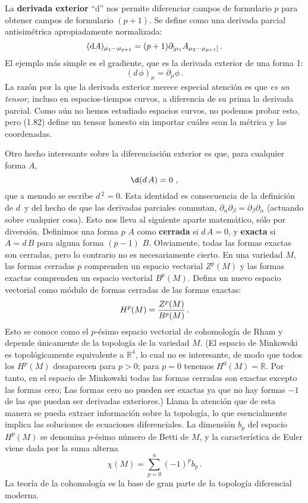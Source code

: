\documentclass[11pt,b5paper,openany,twoside]{book}
\newcommand{\p}[1]{{\partial_{#1}}}
\begin{document}
La {\bf derivada exterior} ``d'' nos permite diferenciar campos de formulario $p$ para obtener campos de formulario $(p+1)$.
Se define como una derivada parcial antisimétrica apropiadamente normalizada:
\begin{equation}
({\rm d}A)_{\mu_1\cdots\mu_{p+1}} = (p+1)\p{[\mu_1}
A_{\mu_2\cdots \mu_{p+1}]}\,.\label{1.82}
\end{equation}
El ejemplo más simple es el gradiente, que es la derivada exterior de una forma 1:
\begin{equation}
( d\, \phi)_\mu = \p{\mu} \phi\,.\label{1.83}
\end{equation}
La razón por la que la derivada exterior merece especial atención es que \textit{es un tensor}, incluso en espacios-tiempos curvos, a diferencia de su prima la derivada parcial.
Como aún no hemos estudiado espacios curvos, no podemos probar esto, pero (1.82) define un tensor honesto sin importar cuáles sean la métrica y las coordenadas.

Otro hecho interesante sobre la diferenciación exterior es que, para cualquier forma $A$,
\begin{equation}
\d( d\,A) =0\ ,\label{1.84}
\end{equation}
que a menudo se escribe $ d\,^2 =0$.
Esta identidad es consecuencia de la definición de $ d\,$ y del hecho de que las derivadas parciales conmutan, $\p\alpha\p\beta = \p\beta\p\alpha$ (actuando sobre cualquier cosa).
Esto nos lleva al siguiente aparte matemático, sólo por diversión.
Definimos una forma $p$ $A$ como {\bf cerrada} si $ d\,A=0$, y {\bf exacta} si $A =  d\,B$ para alguna forma $(p-1)$ $B$.
Obviamente, todas las formas exactas son cerradas, pero lo contrario no es necesariamente cierto.
En una variedad $M$, las formas cerradas $p$ comprenden un espacio vectorial $Z^p(M)$ y las formas exactas comprenden un espacio vectorial $B^p(M)$.
Defina un nuevo espacio vectorial como módulo de formas cerradas de las formas exactas:
\begin{equation}
H^p(M) = {{Z^p(M)}\over{B^p(M)}}\,.\label{1.85}
\end{equation}
Esto se conoce como el $p$-ésimo espacio vectorial de cohomología de Rham y depende únicamente de la topología de la variedad $M$.
(El espacio de Minkowski es topológicamente equivalente a $\mathbb{R}^4$, lo cual no es interesante, de modo que todos los $H^p(M)$ desaparecen para $p>0$; para $p=0$ tenemos $H^0(M)=\mathbb{R}$.
Por tanto, en el espacio de Minkowski todas las formas cerradas son exactas excepto las formas cero; Las formas cero no pueden ser exactas ya que no hay formas $-1$ de las que puedan ser derivadas exteriores.)
Llama la atención que de esta manera se pueda extraer información sobre la topología, lo que esencialmente implica las soluciones de ecuaciones diferenciales.
La dimensión $b_p$ del espacio $H^p(M)$ se denomina $p$-ésimo número de Betti de $M$, y la característica de Euler viene dada por la suma alterna
\begin{equation}
\chi(M) = \sum_{p=0}^{n} (-1)^p b_p\,.\label{1.86}
\end{equation}
La teoría de la cohomología es la base de gran parte de la topología diferencial moderna.
\end{document}
